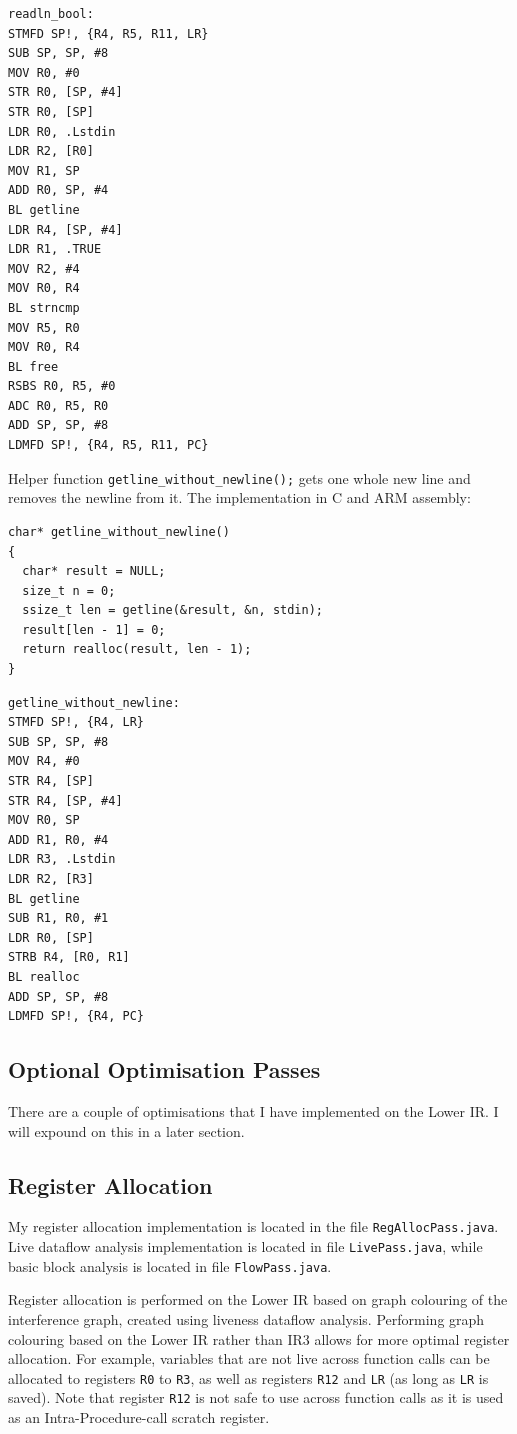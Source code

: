 \documentclass[nonacm, acmsmall, screen, 10pt]{acmart}
\begin{document}
\begin{verbatim}
readln_bool:
STMFD SP!, {R4, R5, R11, LR}
SUB SP, SP, #8
MOV R0, #0
STR R0, [SP, #4]
STR R0, [SP]
LDR R0, .Lstdin
LDR R2, [R0]
MOV R1, SP
ADD R0, SP, #4
BL getline
LDR R4, [SP, #4]
LDR R1, .TRUE
MOV R2, #4
MOV R0, R4
BL strncmp
MOV R5, R0
MOV R0, R4
BL free
RSBS R0, R5, #0
ADC R0, R5, R0
ADD SP, SP, #8
LDMFD SP!, {R4, R5, R11, PC}
\end{verbatim}

Helper function \texttt{getline_without_newline();} gets one whole new line and removes the newline from it.
The implementation in C and ARM assembly:
\begin{verbatim}
char* getline_without_newline()
{
  char* result = NULL;
  size_t n = 0;
  ssize_t len = getline(&result, &n, stdin);
  result[len - 1] = 0;
  return realloc(result, len - 1);
}
\end{verbatim}

\begin{verbatim}
getline_without_newline:
STMFD SP!, {R4, LR}
SUB SP, SP, #8
MOV R4, #0
STR R4, [SP]
STR R4, [SP, #4]
MOV R0, SP
ADD R1, R0, #4
LDR R3, .Lstdin
LDR R2, [R3]
BL getline
SUB R1, R0, #1
LDR R0, [SP]
STRB R4, [R0, R1]
BL realloc
ADD SP, SP, #8
LDMFD SP!, {R4, PC}
\end{verbatim}

\subsection{Optional Optimisation Passes}
There are a couple of optimisations that I have implemented on the Lower IR.
I will expound on this in a later section.

\subsection{Register Allocation}
My register allocation implementation is located in the file \texttt{RegAllocPass.java}.
Live dataflow analysis implementation is located in file \texttt{LivePass.java}, while basic block analysis is located in file \texttt{FlowPass.java}.

Register allocation is performed on the Lower IR based on graph colouring of the interference graph, created using liveness dataflow analysis.
Performing graph colouring based on the Lower IR rather than IR3 allows for more optimal register allocation.
For example, variables that are not live across function calls can be allocated to registers \texttt{R0} to \texttt{R3}, as well as registers \texttt{R12} and \texttt{LR} (as long as \texttt{LR} is saved).
Note that register \texttt{R12} is not safe to use across function calls as it is used as an Intra-Procedure-call scratch register.
\end{document}

